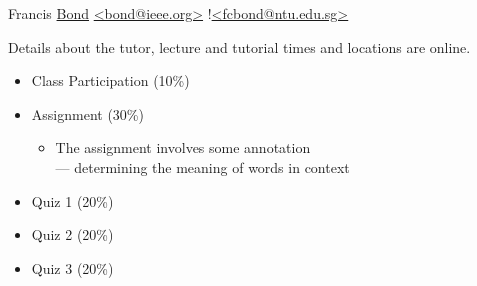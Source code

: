 \documentclass[headrule,footrule]{foils}
\begin{document}
\begin{description}\addtolength{\itemsep}{-5mm}
\item [Coordinator]  Francis \ul{Bond} 
{\small \url{<bond@ieee.org>} !\url{<fcbond@ntu.edu.sg>}}
\item Details about the tutor, lecture and tutorial times and
  locations are online.


\end{description}





\begin{itemize}
\item Class Participation (10\%)
\item Assignment (30\%)
  \begin{itemize}
  \item The assignment involves some annotation 
    \\ --- determining the meaning of words in context
  \end{itemize}
\item Quiz 1 (20\%)
\item Quiz 2 (20\%)
\item Quiz 3 (20\%)
\end{itemize}
\end{document}
